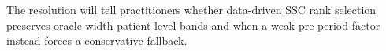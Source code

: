 The resolution will tell practitioners whether data-driven SSC rank selection preserves oracle-width patient-level bands and when a weak pre-period factor instead forces a conservative fallback.